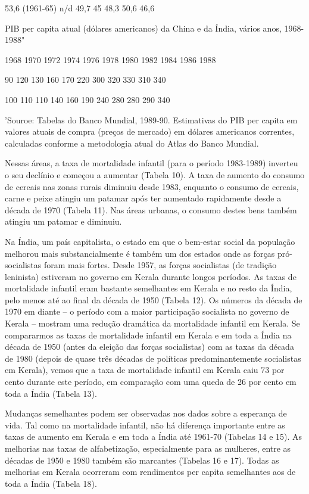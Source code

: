 \documentclass[twocolumn,amsmath,amssymb,aps,pre,floatfix]{revtex4-2}
\begin{document}
53,6 (1961-65) n/d 49,7 45 48,3 50,6 46,6
\par
PIB per capita atual (dólares americanos) da China e da Índia, vários anos, 1968-1988"
\par
1968 1970 1972 1974 1976 1978 1980 1982 1984 1986 1988
\par
90 120 130 160 170 220 300 320 330 310 340
\par
100 110 110 140 160 190 240 280 280 290 340
\par
'Souroe: Tabelas do Banco Mundial, 1989-90. Estimativas do PIB per capita em valores atuais de compra (preços de mercado) em dólares americanos correntes, calculadas conforme a metodologia atual do Atlas do Banco Mundial.
\par
Nessas áreas, a taxa de mortalidade infantil (para o período 1983-1989) inverteu o seu declínio e começou a aumentar (Tabela 10). A taxa de aumento do consumo de cereais nas zonas rurais diminuiu desde 1983, enquanto o consumo de cereais, carne e peixe atingiu um patamar após ter aumentado rapidamente desde a década de 1970 (Tabela 11). Nas áreas urbanas, o consumo destes bens também atingiu um patamar e diminuiu.
\par
Na Índia, um país capitalista, o estado em que o bem-estar social da população melhorou mais substancialmente é também um dos estados onde as forças pró-socialistas foram mais fortes. Desde 1957, as forças socialistas (de tradição leninista) estiveram no governo em Kerala durante longos períodos. As taxas de mortalidade infantil eram bastante semelhantes em Kerala e no resto da Índia, pelo menos até ao final da década de 1950 (Tabela 12). Os números da década de 1970 em diante – o período com a maior participação socialista no governo de Kerala – mostram uma redução dramática da mortalidade infantil em Kerala. Se compararmos as taxas de mortalidade infantil em Kerala e em toda a Índia na década de 1950 (antes da eleição das forças socialistas) com as taxas da década de 1980 (depois de quase três décadas de políticas predominantemente socialistas em Kerala), vemos que a taxa de mortalidade infantil em Kerala caiu 73 por cento durante este período, em comparação com uma queda de 26 por cento em toda a Índia (Tabela 13).
\par
Mudanças semelhantes podem ser observadas nos dados sobre a esperança de vida. Tal como na mortalidade infantil, não há diferença importante entre as taxas de aumento em Kerala e em toda a Índia até 1961-70 (Tabelas 14 e 15). As melhorias nas taxas de alfabetização, especialmente para as mulheres, entre as décadas de 1950 e 1980 também são marcantes (Tabelas 16 e 17). Todas as melhorias em Kerala ocorreram com rendimentos per capita semelhantes aos de toda a Índia (Tabela 18).
\end{document}
